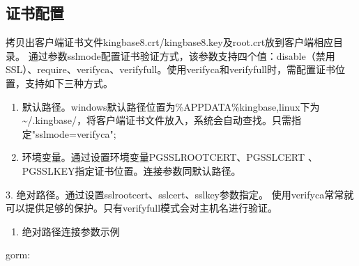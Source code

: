 \documentclass[letterpaper,10pt,english]{sphinxmanual}
\begin{document}
\subsection{证书配置}
\label{\detokenize{interface/SSL:id3}}
拷贝出客户端证书文件kingbase8.crt/kingbase8.key及root.crt放到客户端相应目录。
通过参数sslmode配置证书验证方式，该参数支持四个值：disable（禁用SSL）、require、verify\sphinxhyphen{}ca、verify\sphinxhyphen{}full。使用verify\sphinxhyphen{}ca和verify\sphinxhyphen{}full时，需配置证书位置，支持如下三种方式。
\begin{enumerate}
%
\item {} 
默认路径。windows默认路径位置为\%APPDATA\%kingbase,linux下为\textasciitilde{}/.kingbase/，将客户端证书文件放入，系统会自动查找。只需指定"sslmode=verify\sphinxhyphen{}ca";

\item {} 
环境变量。通过设置环境变量PGSSLROOTCERT、PGSSLCERT 、PGSSLKEY指定证书位置。连接参数同默认路径。

\end{enumerate}

3. 绝对路径。通过设置sslrootcert、sslcert、sslkey参数指定。
使用verify\sphinxhyphen{}ca常常就可以提供足够的保护。只有verify\sphinxhyphen{}full模式会对主机名进行验证。
\begin{enumerate}
%
\setcounter{enumi}{3}
\item {} 
绝对路径连接参数示例

\end{enumerate}

gorm:
\end{document}
